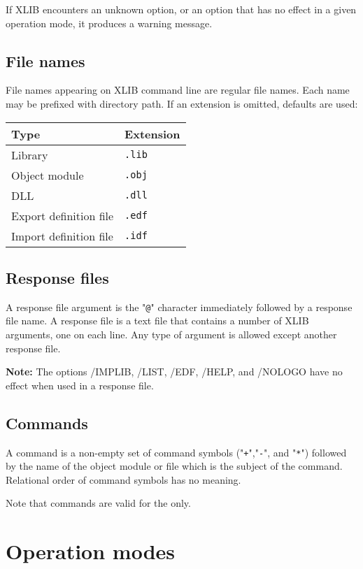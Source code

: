 If XLIB encounters an unknown option, or an option that has no
effect in a given operation mode, it produces a warning message.

\subsection{File names}

File names appearing on XLIB command line are regular file
names. Each name may be prefixed with directory path.
If an extension is omitted, defaults are used:

\begin{tabular}{ll}
\bf Type         & \bf Extension \\
\hline
Library                & \tt .lib \\
Object module          & \tt .obj \\
DLL                    & \tt .dll \\
Export definition file & \tt .edf \\
Import definition file & \tt .idf
\end{tabular}

\subsection{Response files}

A response file argument is the "\verb'@'" character immediately
followed by a response file name.
A response file is a text file that contains a number
of XLIB arguments, one on each line. Any type of argument is allowed
except another response file.

{\bf Note:} The options /IMPLIB, /LIST, /EDF, /HELP, and /NOLOGO
have no effect when used in a response file.

\subsection{Commands}
\label{xlib:start:commands}

A command is a non-empty set of command symbols
("\verb'+'","\verb'-'", and "\verb'*'")
followed by the name of the object module or file which is the
subject of the command. Relational order of command symbols has no meaning.

Note that commands are valid for the
 only.

\section{Operation modes}
\label{xlib:modes}


